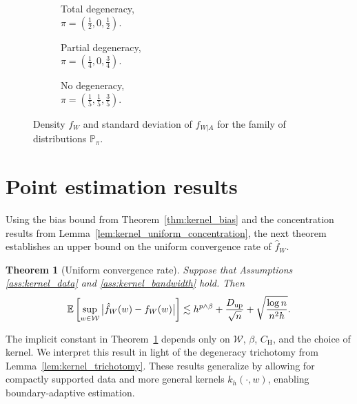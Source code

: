 \documentclass[11pt,lof]{puthesis}
\renewcommand{\P}{\ensuremath{\mathbb{P}}}
\newcommand{\E}{\ensuremath{\mathbb{E}}}
\newcommand{\rH}{\ensuremath{\mathrm{H}}}
\newcommand{\cW}{\ensuremath{\mathcal{W}}}
\newcommand{\Du}{\ensuremath{D_{\textup{up}}}}
\theoremstyle{break}
\newtheorem{theorem}{Theorem}[section]
\theoremstyle{proof}
\begin{document}
\begin{figure}[t]
  \centering
  \begin{subfigure}{0.32\textwidth}
    \centering
    \caption{Total degeneracy, \\
    $\pi = \left( \frac{1}{2}, 0, \frac{1}{2} \right)$.}
  \end{subfigure}
  \begin{subfigure}{0.32\textwidth}
    \centering
    \caption{Partial degeneracy, \\
    $\pi = \left( \frac{1}{4}, 0, \frac{3}{4} \right)$.}
  \end{subfigure}
  \begin{subfigure}{0.32\textwidth}
    \centering
    \caption{No degeneracy, \\
    $\pi = \left( \frac{1}{5}, \frac{1}{5}, \frac{3}{5} \right)$.}
  \end{subfigure}
  \caption[The family of distributions $\P_\pi$]{
    Density $f_W$ and standard deviation
  of $f_{W|A}$ for the family of distributions $\P_\pi$.}
  \label{fig:kernel_distribution}
\end{figure}

\section{Point estimation results}
\label{sec:kernel_point_estimation}

Using the bias bound from Theorem~\ref{thm:kernel_bias} and
the concentration results from Lemma~\ref{lem:kernel_uniform_concentration},
the next theorem establishes an upper bound on the uniform convergence rate of
$\hat f_W$.
%
\begin{theorem}[Uniform convergence rate]%
  \label{thm:kernel_uniform_consistency}%
  Suppose that Assumptions \ref{ass:kernel_data} and
  \ref{ass:kernel_bandwidth} hold. Then
  \begin{align*}
    \E\left[
      \sup_{w \in \cW}
      \big|\hat{f}_W(w) - f_W(w)\big|
    \right]
    \lesssim
    h^{p\wedge\beta} + \frac{\Du}{\sqrt n} + \sqrt{\frac{\log n}{n^2h}}.
  \end{align*}
\end{theorem}
%
The implicit constant in Theorem~\ref{thm:kernel_uniform_consistency} depends
only on
$\cW$, $\beta$, $C_\rH$, and the choice of kernel. We interpret this result in
light of the degeneracy trichotomy from Lemma~\ref{lem:kernel_trichotomy}.
These results generalize \citet*[Theorem~1]{chiang2020empirical}
by allowing for compactly supported data and more general kernels
$k_h(\cdot,w)$, enabling boundary-adaptive estimation.
\end{document}
